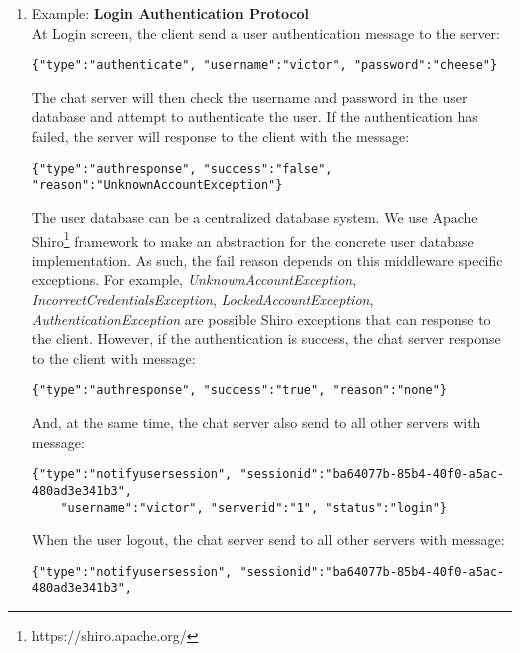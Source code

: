 \documentclass[dareport.tex]{subfiles}
\begin{document}
\begin{enumerate}[leftmargin=*]
\item Example: \textbf{Login Authentication Protocol}
\\
At Login screen, the client send a user authentication message to the server:
\begin{small}
\begin{verbatim}
{"type":"authenticate", "username":"victor", "password":"cheese"}
\end{verbatim}
\end{small}
The chat server will then check the username and password in the user database and attempt to authenticate the user. If the authentication has failed, the server will response to the client with the message:
\begin{small}
\begin{verbatim}
{"type":"authresponse", "success":"false", "reason":"UnknownAccountException"}
\end{verbatim}
\end{small}
The user database can be a centralized database system.
We use Apache Shiro\footnote{https://shiro.apache.org/} framework to make an abstraction for the concrete user database implementation. As such, the fail reason depends on this middleware specific exceptions. For example, \textit{UnknownAccountException}, \textit{IncorrectCredentialsException}, \textit{LockedAccountException}, \textit{AuthenticationException} are possible Shiro exceptions that can response to the client.
However, if the authentication is success, the chat server response to the client with message:
\begin{small}
\begin{verbatim}
{"type":"authresponse", "success":"true", "reason":"none"}
\end{verbatim}
\end{small}
And, at the same time, the chat server also send to all other servers with message:
\begin{small}
\begin{verbatim}
{"type":"notifyusersession", "sessionid":"ba64077b-85b4-40f0-a5ac-480ad3e341b3", 
    "username":"victor", "serverid":"1", "status":"login"}
\end{verbatim}
\end{small}
When the user logout, the chat server send to all other servers with message:
\begin{small}
\begin{verbatim}
{"type":"notifyusersession", "sessionid":"ba64077b-85b4-40f0-a5ac-480ad3e341b3",

\end{verbatim}
\end{small}
\end{enumerate}
\end{document}

